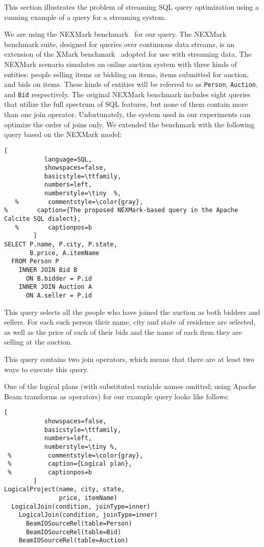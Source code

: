 \label {sec:fs-optimization-problem-statement}

This section illustrates the problem of streaming SQL query optimization using a running example of a query for a streaming system.

We are using the NEXMark benchmark~\cite{tucker2008nexmark} for our query. The NEXMark benchmark suite, designed for queries over continuous data streams, is an extension of the XMark benchmark~\cite{schmidt2002xmark} adopted for use with streaming data. 
The NEXMark scenario simulates an online auction system with three kinds of entities: people selling items or bidding on items, items submitted for auction, and bids on items. 
These kinds of entities will be referred to as \texttt{Person}, \texttt{Auction}, and \texttt{Bid} respectively. 
The original NEXMark benchmark includes eight queries that utilize the full spectrum of SQL features, but none of them contain more than one join operator.  Unfortunately, the system used in our experiments can optimize the order of joins only. 
We extended the benchmark with  the following query based on the NEXMark model:  



\begin{lstlisting}[
           language=SQL,
           showspaces=false,
           basicstyle=\ttfamily,
           numbers=left,
           numberstyle=\tiny  %,
   %        commentstyle=\color{gray},
%        caption={The proposed NEXMark-based query in the Apache Calcite SQL dialect}, 
   %        captionpos=b
        ]
SELECT P.name, P.city, P.state, 
       B.price, A.itemName 
  FROM Person P 
    INNER JOIN Bid B 
      ON B.bidder = P.id 
    INNER JOIN Auction A 
      ON A.seller = P.id
\end{lstlisting}

This query selects all the people who have joined the auction as both bidders and sellers. 
For each such person their name, city and state of residence are selected, as well as the price of each of their bids and the name of each item they are selling at the auction. 

This query contains two join operators, which means that there are at least two ways to execute this query.

One of the logical   plans (with substituted variable names omitted; using Apache Beam transforms as operators) for our example query looks like  follows: 

\begin{lstlisting}[
           showspaces=false,
           basicstyle=\ttfamily,
           numbers=left,
           numberstyle=\tiny %,
 %          commentstyle=\color{gray},
 %          caption={Logical plan}, 
 %          captionpos=b
        ]
LogicalProject(name, city, state, 
               price, itemName)
  LogicalJoin(condition, joinType=inner) 
    LogicalJoin(condition, joinType=inner)
      BeamIOSourceRel(table=Person)
      BeamIOSourceRel(table=Bid)
    BeamIOSourceRel(table=Auction)
\end{lstlisting}

